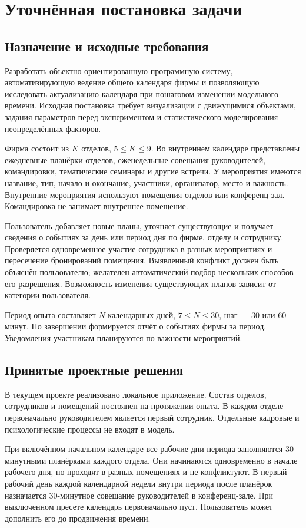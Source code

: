 \section{Уточнённая постановка задачи}
\subsection{Назначение и исходные требования}
Разработать объектно-ориентированную программную систему, автоматизирующую ведение общего календаря фирмы и позволяющую исследовать актуализацию календаря при пошаговом изменении модельного времени. Исходная постановка требует визуализации с движущимися объектами, задания параметров перед экспериментом и статистического моделирования неопределённых факторов.

Фирма состоит из $K$ отделов, $5\le K\le9$. Во внутреннем календаре представлены ежедневные планёрки отделов, еженедельные совещания руководителей, командировки, тематические семинары и другие встречи. У мероприятия имеются название, тип, начало и окончание, участники, организатор, место и важность. Внутренние мероприятия используют помещения отделов или конференц-зал. Командировка не занимает внутреннее помещение.

Пользователь добавляет новые планы, уточняет существующие и получает сведения о событиях за день или период дня по фирме, отделу и сотруднику. Проверяется одновременное участие сотрудника в разных мероприятиях и пересечение бронирований помещения. Выявленный конфликт должен быть объяснён пользователю; желателен автоматический подбор нескольких способов его разрешения. Возможность изменения существующих планов зависит от категории пользователя.

Период опыта составляет $N$ календарных дней, $7\le N\le30$, шаг --- 30 или 60 минут. По завершении формируется отчёт о событиях фирмы за период. Уведомления участникам планируются по важности мероприятий.

\subsection{Принятые проектные решения}
В текущем проекте реализовано локальное приложение. Состав отделов, сотрудников и помещений постоянен на протяжении опыта. В каждом отделе первоначально руководителем является первый сотрудник. Отдельные кадровые и психологические процессы не входят в модель.

При включённом начальном календаре все рабочие дни периода заполняются 30-минутными планёрками каждого отдела. Они начинаются одновременно в начале рабочего дня, но проходят в разных помещениях и не конфликтуют. В первый рабочий день каждой календарной недели внутри периода после планёрок назначается 30-минутное совещание руководителей в конференц-зале. При выключенном пресете календарь первоначально пуст. Пользователь может дополнить его до продвижения времени.

